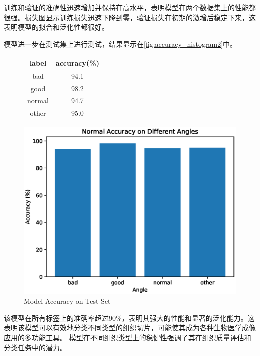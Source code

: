 训练和验证的准确性迅速增加并保持在高水平，表明模型在两个数据集上的性能都很强。损失图显示训练损失迅速下降到零，验证损失在初期的激增后稳定下来，这表明模型的拟合和泛化性都很好。

模型进一步在测试集上进行测试，结果显示在\autoref{fig:accuracy_histogram2}中。

\begin{figure}[H]
    \begin{minipage}{0.45\textwidth}
        \centering
        \begin{tabular}{ccccc}
            \toprule
            label & accuracy(\%) \\
            \midrule
            bad & 94.1 \\
            good & 98.2 \\
            normal & 94.7 \\
            other & 95.0 \\
            \bottomrule
        \end{tabular}
        \label{tab:model_accuracy3}
    \end{minipage}
    \begin{minipage}{0.45\textwidth}
        \centering
        \includegraphics[width=\textwidth]{./fig/assistplot/angle_accuracy2.eps}
        \caption{Model Accuracy on Test Set}
        \label{fig:accuracy_histogram2}
    \end{minipage}
\end{figure}

该模型在所有标签上的准确率超过90\%，表明其强大的性能和显著的泛化能力。这表明该模型可以有效地分类不同类型的组织切片，可能使其成为各种生物医学成像应用的多功能工具。 模型在不同组织类型上的稳健性强调了其在组织质量评估和分类任务中的潜力。

\FloatBarrier